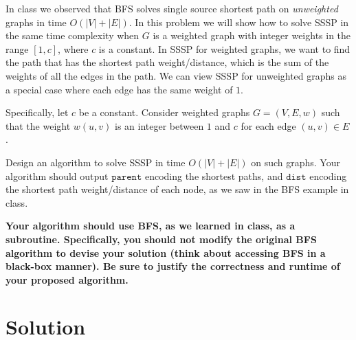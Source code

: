 \documentclass[11pt]{article}
\begin{document}
    
    \begin{tcolorbox}[title={Problem 1 (Fast SSSP, 35 pts)}] \setlength\parindent{1em}
        In class we observed that BFS solves single source shortest path on \emph{unweighted} graphs in time $O(|V|+|E|)$. In this problem we will show how to solve SSSP in the same time complexity when $G$ is a weighted graph with integer weights in the range $[1,c]$, where $c$ is a constant. In SSSP for weighted graphs, we want to find the path that has the shortest path weight/distance, which is the sum of the weights of all the edges in the path. We can view SSSP for unweighted graphs as a special case where each edge has the same weight of $1$.

        \vspace{0.5em}
        Specifically, let $c$ be a constant. Consider weighted graphs $G=(V,E,w)$ such that the weight $w(u,v)$ is an integer between $1$ and $c$ for each edge $(u,v)\in E$. 
            
        Design an algorithm to solve SSSP in time $O(|V|+|E|)$ on such graphs. Your algorithm should output $\texttt{parent}$ encoding the shortest paths, and $\texttt{dist}$ encoding the shortest path weight/distance of each node, as we saw in the BFS example in class. 
        
        \textbf{Your algorithm should use BFS, as we learned in class, as a subroutine. Specifically, you should not modify the original BFS algorithm to devise your solution (think about accessing BFS in a black-box manner). Be sure to justify the correctness and runtime of your proposed algorithm.}  
    \end{tcolorbox}
    \section*{Solution}
\end{document}
